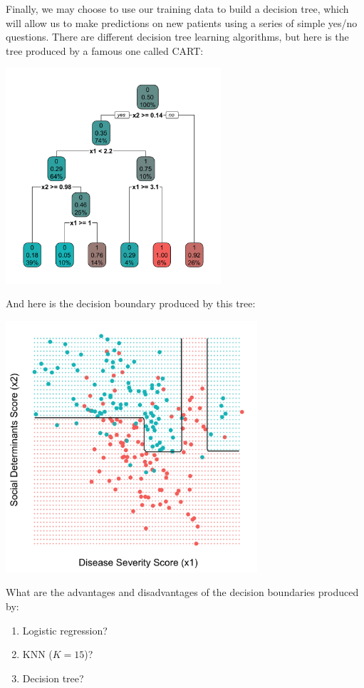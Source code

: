 Finally, we may choose to use our training data to build a decision tree, which will allow us to make predictions on new patients using a series of simple yes/no questions. There are different decision tree learning algorithms, but here is the tree produced by a famous one called CART:
\begin{center}
\includegraphics[width=0.6\textwidth]{img/esl-decision-tree-just-tree.png}
\end{center}
And here is the decision boundary produced by this tree:
\begin{center}
\includegraphics[width=0.7\textwidth]{img/esl-decision-tree.png}
\end{center}

\begin{question}{}
What are the advantages and disadvantages of the decision boundaries produced by:
  \begin{enumerate}
  \item Logistic regression?
  \item KNN ($K=15$)?
  \item Decision tree?
  \end{enumerate}
\end{question}

